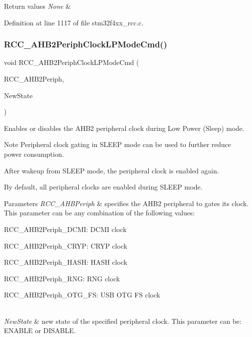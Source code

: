 \begin{DoxyRetVals}{Return values}
{\em None} & \\
\hline
\end{DoxyRetVals}


Definition at line 1117 of file stm32f4xx\+\_\+rcc.\+c.

\mbox{\label{group___r_c_c_ga1ac5bb9676ae9b48e50d6a95de922ce3}} 
\subsubsection{\texorpdfstring{R\+C\+C\+\_\+\+A\+H\+B2\+Periph\+Clock\+L\+P\+Mode\+Cmd()}{RCC\_AHB2PeriphClockLPModeCmd()}}
{\footnotesize\ttfamily void R\+C\+C\+\_\+\+A\+H\+B2\+Periph\+Clock\+L\+P\+Mode\+Cmd (\begin{DoxyParamCaption}\item[{uint32\+\_\+t}]{R\+C\+C\+\_\+\+A\+H\+B2\+Periph,  }\item[{Functional\+State}]{New\+State }\end{DoxyParamCaption})}



Enables or disables the A\+H\+B2 peripheral clock during Low Power (Sleep) mode. 

\begin{DoxyNote}{Note}
Peripheral clock gating in S\+L\+E\+EP mode can be used to further reduce power consumption. 

After wakeup from S\+L\+E\+EP mode, the peripheral clock is enabled again. 

By default, all peripheral clocks are enabled during S\+L\+E\+EP mode. 
\end{DoxyNote}

\begin{DoxyParams}{Parameters}
{\em R\+C\+C\+\_\+\+A\+H\+B\+Periph} & specifies the A\+H\+B2 peripheral to gates its clock. This parameter can be any combination of the following values\+: \begin{DoxyItemize}
\item R\+C\+C\+\_\+\+A\+H\+B2\+Periph\+\_\+\+D\+C\+MI\+: D\+C\+MI clock \item R\+C\+C\+\_\+\+A\+H\+B2\+Periph\+\_\+\+C\+R\+YP\+: C\+R\+YP clock \item R\+C\+C\+\_\+\+A\+H\+B2\+Periph\+\_\+\+H\+A\+SH\+: H\+A\+SH clock \item R\+C\+C\+\_\+\+A\+H\+B2\+Periph\+\_\+\+R\+NG\+: R\+NG clock \item R\+C\+C\+\_\+\+A\+H\+B2\+Periph\+\_\+\+O\+T\+G\+\_\+\+FS\+: U\+SB O\+TG FS clock \end{DoxyItemize}
\\
\hline
{\em New\+State} & new state of the specified peripheral clock. This parameter can be\+: E\+N\+A\+B\+LE or D\+I\+S\+A\+B\+LE. \\
\hline
\end{DoxyParams}

